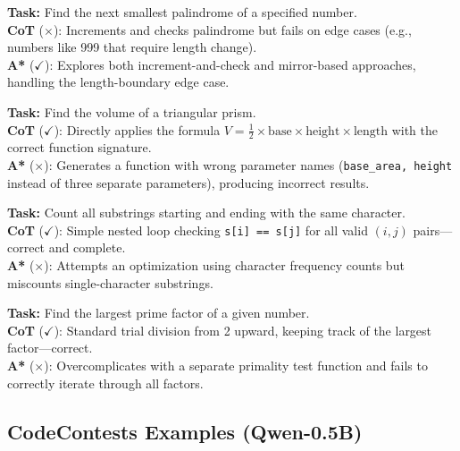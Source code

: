 \documentclass[11pt]{article}
\begin{document}
{{\begin{examplebox}[title=MBPP/100 --- A* Correct{,} CoT Wrong]
\textbf{Task:} Find the next smallest palindrome of a specified number.\\[4pt]
\textbf{CoT} ($\times$): Increments and checks palindrome but fails on edge cases (e.g., numbers like 999 that require length change).\\[4pt]
\textbf{A*} ($\checkmark$): Explores both increment-and-check and mirror-based approaches, handling the length-boundary edge case.
\end{examplebox}

\begin{examplebox}[title=MBPP/14 --- CoT Correct{,} A* Wrong]
\textbf{Task:} Find the volume of a triangular prism.\\[4pt]
\textbf{CoT} ($\checkmark$): Directly applies the formula $V = \frac{1}{2} \times \text{base} \times \text{height} \times \text{length}$ with the correct function signature.\\[4pt]
\textbf{A*} ($\times$): Generates a function with wrong parameter names (\texttt{base\_area, height} instead of three separate parameters), producing incorrect results.
\end{examplebox}

\begin{examplebox}[title=MBPP/30 --- CoT Correct{,} A* Wrong]
\textbf{Task:} Count all substrings starting and ending with the same character.\\[4pt]
\textbf{CoT} ($\checkmark$): Simple nested loop checking \texttt{s[i] == s[j]} for all valid $(i,j)$ pairs---correct and complete.\\[4pt]
\textbf{A*} ($\times$): Attempts an optimization using character frequency counts but miscounts single-character substrings.
\end{examplebox}

\begin{examplebox}[title=MBPP/32 --- CoT Correct{,} A* Wrong]
\textbf{Task:} Find the largest prime factor of a given number.\\[4pt]
\textbf{CoT} ($\checkmark$): Standard trial division from 2 upward, keeping track of the largest factor---correct.\\[4pt]
\textbf{A*} ($\times$): Overcomplicates with a separate primality test function and fails to correctly iterate through all factors.
\end{examplebox}

\subsection{CodeContests Examples (Qwen-0.5B)}

}}
\end{document}
